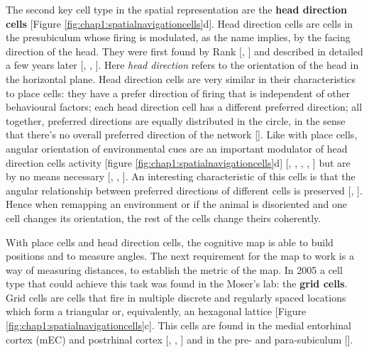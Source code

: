 The second key cell type in the spatial representation are the \textbf{head direction cells} [Figure \ref{fig:chap1:spatialnavigationcells}d].  
Head direction cells are cells in the presubiculum whose firing is modulated, as the name implies, by the facing direction of the head.
They were first found by Rank [\cite{ranck1984}, \cite{ranck1985}] and described in detailed a few years later [\cite{taube1990a.}, \cite{taube1990b}, \cite{taube1987}].
Here \textit{head direction} refers to the orientation of the head in the horizontal plane.
Head direction cells are very similar in their characteristics to place cells: they have a prefer direction of firing that is independent of other behavioural factors; each head direction cell has a different preferred direction; all together, preferred directions are equally distributed in the circle, in the sense that there's no overall preferred direction of the network [\cite{taube1990b}].
Like with place cells, angular orientation of environmental cues are an important modulator of head direction cells activity [figure \ref{fig:chap1:spatialnavigationcells}d] [\cite{goodridge1995}, \cite{taube1995a}, \cite{taube1990b}, \cite{zugaro2000}, \cite{knierim1995}] but are by no means necessary [\cite{mizumori1993}, \cite{yoder2011a}, \cite{yoder2011b}].
An interesting characteristic of this cells is that the angular relationship between preferred directions of different cells is preserved [\cite{skaggs1995}, \cite{yoganarasimha2005}].
Hence when remapping an environment or if the animal is disoriented and one cell changes its orientation, the rest of the cells change theirs coherently.

With place cells and head direction cells, the cognitive map is able to build positions and to measure angles. 
The next requirement for the map to work is a way of measuring distances, to establish the metric of the map.
In 2005 a cell type that could achieve this task was found in the Moser's lab: the \textbf{grid cells}. 
Grid cells are cells that fire in multiple discrete and regularly spaced locations which form a triangular or, equivalently, an hexagonal lattice [Figure \ref{fig:chap1:spatialnavigationcells}c]. 
This cells are found in the medial entorhinal cortex (mEC) and postrhinal cortex [\cite{fyhn2004}, \cite{hafting2005}, \cite{fyhn2008}] and in the pre- and para-subiculum [\cite{boccara2010}]. 

